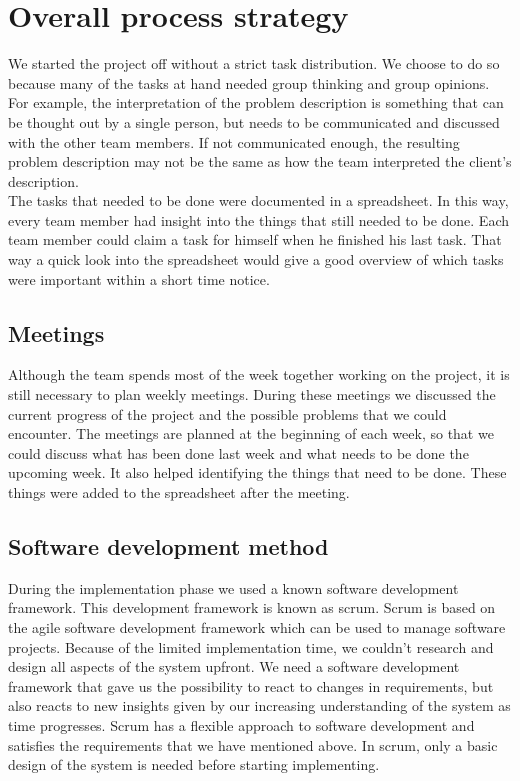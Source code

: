 \section{Overall process strategy}
We started the project off without a strict task distribution.
We choose to do so because many of the tasks at hand needed group thinking and group opinions.
For example, the interpretation of the problem description is something that can be thought out by a single person, but needs to be communicated and discussed with the other team members.
If not communicated enough, the resulting problem description may not be the same as how the team interpreted the client's description.\\
The tasks that needed to be done were documented in a spreadsheet.
In this way, every team member had insight into the things that still needed to be done.
Each team member could claim a task for himself when he finished his last task.
That way a quick look into the spreadsheet would give a good overview of which tasks were important within a short time notice.

\subsection{Meetings}
Although the team spends most of the week together working on the project, it is still necessary to plan weekly meetings.
During these meetings we discussed the current progress of the project and the possible problems that we could encounter.
The meetings are planned at the beginning of each week, so that we could discuss what has been done last week and what needs to be done the upcoming week.
It also helped identifying the things that need to be done.
These things were added to the spreadsheet after the meeting.

\subsection{Software development method}\label{software_development_method}
During the implementation phase we used a known software development framework.
This development framework is known as scrum.
Scrum is based on the agile software development framework which can be used to 
manage software projects.
Because of the limited implementation time, we couldn't research and design all aspects of the system upfront.
We need a software development framework that gave us the possibility to react to changes in requirements, but also reacts to new insights given by our increasing understanding of the system as time progresses.
Scrum has a flexible approach to software development and satisfies the requirements that we have mentioned above.
In scrum, only a basic design of the system is needed before starting implementing.


